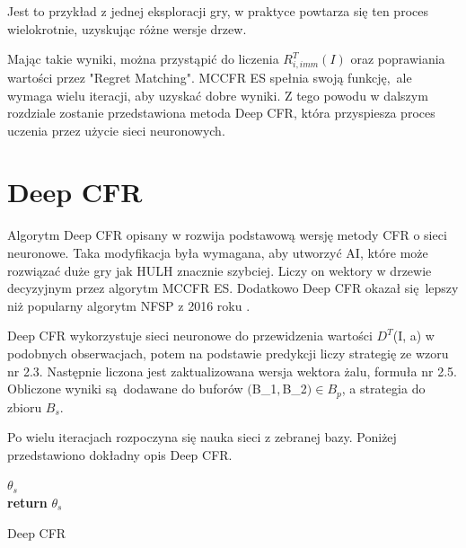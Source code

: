 \documentclass[12pt,oneside,a4paper]{report}
\begin{document}
\vspace{5cm}
Jest to przykład z jednej eksploracji gry, w praktyce powtarza się ten proces wielokrotnie, 
uzyskując różne wersje drzew.


Mając takie wyniki, można przystąpić do liczenia $R_{i,imm}^{T} (I)$ oraz poprawiania 
wartości przez "Regret Matching". MCCFR ES spełnia swoją funkcję, ale wymaga wielu iteracji, aby
uzyskać dobre wyniki. Z tego powodu w dalszym rozdziale zostanie przedstawiona metoda Deep CFR,
która przyspiesza proces uczenia przez użycie sieci neuronowych.

\section{Deep CFR}


Algorytm Deep CFR  opisany w \cite{DCFR} rozwija podstawową wersję metody CFR o sieci neuronowe.
Taka modyfikacja była wymagana, aby utworzyć AI, które może rozwiązać duże gry
jak HULH znacznie szybciej. Liczy on wektory w drzewie decyzyjnym
przez algorytm MCCFR ES. Dodatkowo Deep CFR okazał się lepszy niż 
popularny algorytm NFSP z 2016 roku \cite{DCFR}.

Deep CFR wykorzystuje sieci neuronowe do przewidzenia wartości $D^{T}$(I, a) w podobnych
obserwacjach, potem na
podstawie predykcji liczy strategię ze wzoru nr 2.3.   
Następnie liczona jest zaktualizowana wersja wektora żalu, formuła nr 2.5.
Obliczone wyniki są dodawane do buforów  $($B_{1}$, $B_{2}$) \in B_{p}$, a strategia do zbioru $B_{s}$.


Po wielu iteracjach
rozpoczyna się nauka sieci z zebranej bazy. Poniżej przedstawiono dokładny opis Deep CFR.
\vspace{1cm}

\begin{algorithm}[H]
\DontPrintSemicolon
  
$\theta_{s}$ \leftarrow {} \\
\textbf{return} $\theta_{s}$
 \caption{Deep CFR}
\end{algorithm}
\end{document}
